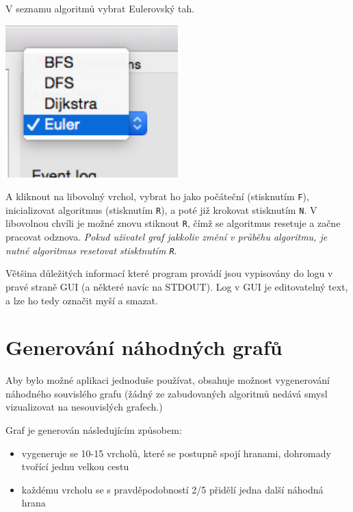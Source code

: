 \documentclass{article}
\def\code#1{\texttt{#1}}
\begin{document}
V seznamu algoritmů vybrat Eulerovský tah.

\vspace{10pt}
\begin{center}
	\includegraphics[width=0.5\textwidth]{ewrHxRO.png}
\end{center}
\vspace{10pt}

A kliknout na libovolný vrchol, vybrat ho jako počáteční (stisknutím \code{F}),
inicializovat algoritmus (stisknutím \code{R}), a poté již krokovat
stisknutím \code{N}. V libovolnou chvíli je možné znovu stiknout \code{R}, čímž se algoritmus
resetuje a začne pracovat odznova. \emph{Pokud uživatel graf jakkoliv změní
v průběhu algoritmu, je nutné algoritmus resetovat stisktnutím \code{R}}.

Většina důležitých informací které program provádí jsou vypisovány do
logu v pravé straně GUI (a některé navíc na STDOUT). Log v GUI je
editovatelný text, a lze ho tedy označit myší a smazat.

\section{Generování náhodných grafů}

Aby bylo možné aplikaci jednoduše používat, obsahuje možnost
vygenerování náhodného souvislého grafu (žádný ze zabudovaných algoritmů
nedává smysl vizualizovat na nesouvislých grafech.)

Graf je generován následujícím způsobem:

\begin{itemize}
  \item vygeneruje se 10-15 vrcholů, které se postupně spojí hranami, dohromady tvořící jednu velkou cestu
  \item každému vrcholu se s pravděpodobností 2/5 přidělí jedna další náhodná hrana
\end{itemize}
\end{document}
